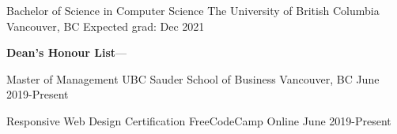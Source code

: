 
\begin{cventries}
  \cventry
    {Bachelor of Science in Computer Science} %
    {The University of British Columbia} %
    {Vancouver, BC} %
    {Expected grad: Dec 2021} %
    {
      \begin{cvitems} %
         \item {\textbf{Dean's Honour List}--- }
      \end{cvitems}
    }
    \linebreak
    \linebreak
    \cventry
    {Master of Management} %
    {UBC Sauder School of Business} %
    {Vancouver, BC} %
    {June 2019-Present} %
    {
      \begin{cvitems} %
      \end{cvitems}
    }
    
    \cventry
    {Responsive Web Design Certification} %
    {FreeCodeCamp} %
    {Online} %
    {June 2019-Present} %
    {
      \begin{cvitems} %
      \end{cvitems}
    }
    
    
    
\end{cventries}
